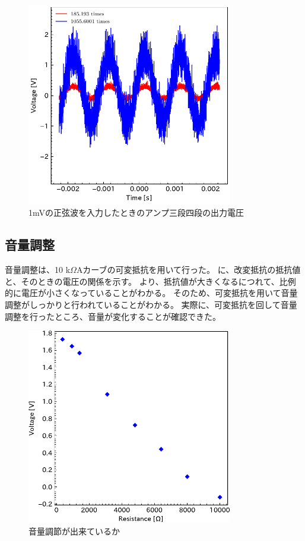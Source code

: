 \documentclass[report.tex]{subfiles}
\begin{document}
\begin{figure}[H]
	\centering
	\includegraphics[width=9cm]{fig/level34_1m.pdf}
	\caption{1mVの正弦波を入力したときのアンプ三段四段の出力電圧}
	\label{fig:34_1m}
\end{figure}

\subsection{音量調整}

音量調整は、10 k\(\Omega\)Aカーブの可変抵抗を用いて行った。
に、改変抵抗の抵抗値と、そのときの電圧の関係を示す。
より、抵抗値が大きくなるにつれて、比例的に電圧が小さくなっていることがわかる。
そのため、可変抵抗を用いて音量調整がしっかりと行われていることがわかる。
実際に、可変抵抗を回して音量調整を行ったところ、音量が変化することが確認できた。

\begin{figure}[H]
	\centering
	\includegraphics[width=9cm]{fig/resi.pdf}
	\caption{音量調節が出来ているか}
	\label{fig:resi}
\end{figure}
\end{document}
